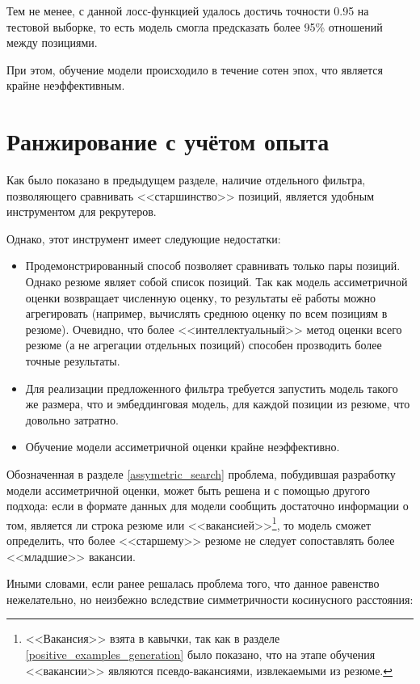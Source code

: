 \documentclass[14pt]{mmcs_article}
\begin{document}
Тем не менее, с данной лосс-функцией удалось достичь точности 0.95 на тестовой выборке, то есть модель смогла предсказать более 95\% отношений между позициями.

При этом, обучение модели происходило в течение сотен эпох, что является крайне неэффективным.


\newpage
\section{Ранжирование с учётом опыта}\label{experience_ranking}

Как было показано в предыдущем разделе, наличие отдельного фильтра, позволяющего сравнивать <<старшинство>> позиций, является удобным инструментом для рекрутеров.

Однако, этот инструмент имеет следующие недостатки:

\begin{itemize}
  \item Продемонстрированный способ позволяет сравнивать только пары позиций. Однако резюме являет собой список позиций. Так как модель ассиметричной оценки возвращает численную оценку, то результаты её работы можно агрегировать (например, вычислять среднюю оценку по всем позициям в резюме). Очевидно, что более <<интеллектуальный>> метод оценки всего резюме (а не агрегации отдельных позиций) способен прозводить более точные результаты.
  \item Для реализации предложенного фильтра требуется запустить модель такого же размера, что и эмбеддинговая модель, для каждой позиции из резюме, что довольно затратно.
  \item Обучение модели ассиметричной оценки крайне неэффективно.
\end{itemize}

Обозначенная в разделе \ref{assymetric_search} проблема, побудившая разработку модели ассиметричной оценки, может быть решена и с помощью другого подхода: если в формате данных для модели сообщить достаточно информации о том, является ли строка резюме или <<вакансией>>\footnote{<<Вакансия>> взята в кавычки, так как в разделе \ref{positive_examples_generation} было показано, что на этапе обучения <<вакансии>> являются псевдо-вакансиями, извлекаемыми из резюме.}, то модель сможет определить, что более <<старшему>> резюме не следует сопоставлять более <<младшие>> вакансии.

Иными словами, если ранее решалась проблема того, что данное равенство нежелательно, но неизбежно вследствие симметричности косинусного расстояния:
\end{document}
